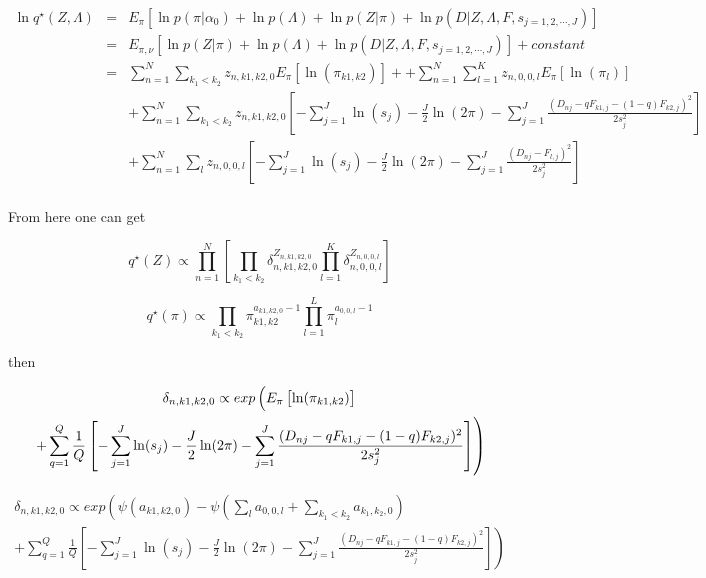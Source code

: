 \documentclass[11pt,authoryear]{article}
\begin{document}
\begin{eqnarray}
\ln q^{\star} (Z, \Lambda)  & = & E_{\pi} \left [ \ln p(\pi|\alpha_0) +  \ln p(\Lambda ) + \ln p(Z | \pi) + \ln p(D | Z, \Lambda, F, s_{j=1,2,\cdots,J}) \right ] \\ \nonumber
  & = & E_{\pi, \nu} \left [ \ln p(Z | \pi) + \ln p(\Lambda ) + \ln p(D | Z, \Lambda, F, s_{j=1,2,\cdots,J}) \right] + constant \\\nonumber
  & = & \sum_{n=1}^{N} \sum_{k_1 < k_2} z_{n, k1, k2, 0}  E_{\pi} \left [ \ln (\pi_{k1, k2}) \right ]  + +  \sum_{n=1}^{N} \sum_{l=1}^{K} z_{n, 0, 0, l} E_{\pi} \left [ \ln (\pi_{l}) \right ] \\ \nonumber
  &&  + \sum_{n=1}^{N} \sum_{k_1 < k_2} z_{n, k1, k2, 0} \left [ - \sum_{j=1}^{J} \ln (s_j) - \frac{J}{2} \ln (2 \pi) - \sum_{j=1}^{J} \frac{(D_{nj} - qF_{k1,j} - (1-q)F_{k2,j})^2}{2s^2_j} \right] \\ \nonumber
  &&  +  \sum_{n=1}^{N} \sum_{l}  z_{n, 0, 0, l} \left [ - \sum_{j=1}^{J} \ln (s_j) - \frac{J}{2} \ln (2 \pi) - \sum_{j=1}^{J} \frac{(D_{nj} - F_{l,j} )^2}{2s^2_j} \right] \\ \nonumber 
\end{eqnarray}

From here one can get 

$$ q^{\star}(Z) \propto \prod_{n=1}^{N} \left[\prod_{k_1 < k_2} \delta_{n, k1, k2, 0}^{Z_{n, k1, k2, 0}}  \prod_{l=1}^{K} \delta_{n, 0, 0, l}^{Z_{n, 0, 0, l}} \right]$$

$$ q^{\star} (\pi) \propto  \prod_{k_1 < k_2} \pi_{k1, k2}^{a_{k1,k2,0} -1} \prod_{l=1}^{L} \pi_{l}^{a_{0,0,l} -1}$$

%
%
%
then 

\begin{multline}
 $$ \delta_{n, k1, k2, 0} \propto exp \left (  E_{\pi} \left [ \ln (\pi_{k1,k2}) \right]  \right. \\
 \left . +  \sum_{q=1}^{Q} \frac{1}{Q} \left [ - \sum_{j=1}^{J} \ln (s_j)  - \frac{J}{2} \ln (2 \pi) - \sum_{j=1}^{J} \frac{(D_{nj} - qF_{k1,j} - (1-q)F_{k2,j})^2}{2s^2_j} \right] \right ) 
\end{multline}

\begin{multline}
  \delta_{n, k1, k2, 0} \propto exp \left ( \psi({a_{k1, k2, 0}}) - \psi(\sum_{l} a_{0, 0, l} + \sum_{k_1 < k_2} a_{k_1, k_2, 0})   \right . \\
  \left . + \sum_{q=1}^{Q} \frac{1}{Q} \left [ - \sum_{j=1}^{J} \ln (s_j)  - \frac{J}{2} \ln (2 \pi) -  \sum_{j=1}^{J} \frac{(D_{nj} - qF_{k1,j} - (1-q)F_{k2,j})^2}{2s^2_j} \right] \right ) 
\end{multline}
\end{document}
